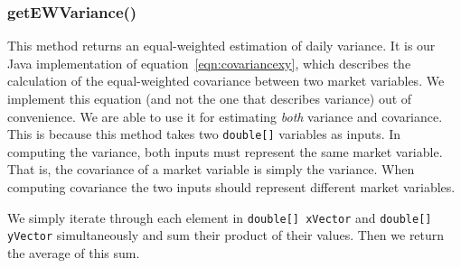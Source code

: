 \documentclass[../Dissertation.tex]{subfiles}
\begin{document}
\subsubsection{getEWVariance()}
This method returns an equal-weighted estimation of daily variance.
It is our Java implementation of equation~\ref{eqn:covariancexy}, which describes the calculation of the equal-weighted covariance between two market variables.
We implement this equation (and not the one that describes variance) out of convenience.
We are able to use it for estimating \textit{both} variance and covariance.
This is because this method takes two \lstinline|double[]| variables as inputs.
In computing the variance, both inputs must represent the same market variable.
That is, the covariance of a market variable is simply the variance.
When computing covariance the two inputs should represent different market variables.

We simply iterate through each element in \lstinline|double[] xVector| and \lstinline|double[] yVector| simultaneously and sum their product of their values.
Then we return the average of this sum.
\end{document}
